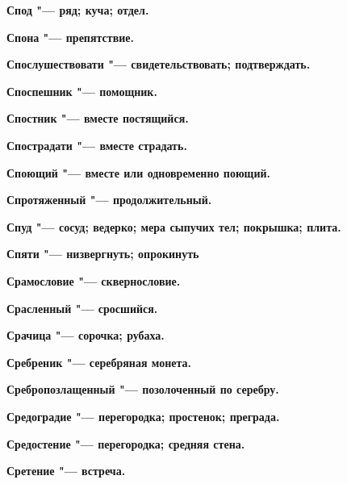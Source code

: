 \begin{multicols}{2}
\bfseries Спод\normalfont{} "--- ряд; куча; отдел. 




\bfseries Спона\normalfont{} "--- препятствие. 




\bfseries Спослушествовати\normalfont{} "--- свидетельствовать; подтверждать. 




\bfseries Споспешник\normalfont{} "--- помощник. 




\bfseries Спостник\normalfont{} "--- вместе постящийся. 




\bfseries Спострадати\normalfont{} "--- вместе страдать. 




\bfseries Споющий\normalfont{} "--- вместе или одновременно поющий. 




\bfseries Спротяженный\normalfont{} "--- продолжительный. 




\bfseries Спуд\normalfont{} "--- сосуд; ведерко; мера сыпучих тел; покрышка; плита. 




\bfseries Спяти\normalfont{} "--- низвергнуть; опрокинуть 




\bfseries Срамословие\normalfont{} "--- сквернословие. 




\bfseries Срасленный\normalfont{} "--- сросшийся. 




\bfseries Срачица\normalfont{} "--- сорочка; рубаха. 




\bfseries Сребреник\normalfont{} "--- серебряная монета. 




\bfseries Сребропозлащенный\normalfont{} "--- позолоченный по серебру. 




\bfseries Средоградие\normalfont{} "--- перегородка; простенок; преграда. 




\bfseries Средостение\normalfont{} "--- перегородка; средняя стена. 




\bfseries Сретение\normalfont{} "--- встреча. 





\end{multicols}
